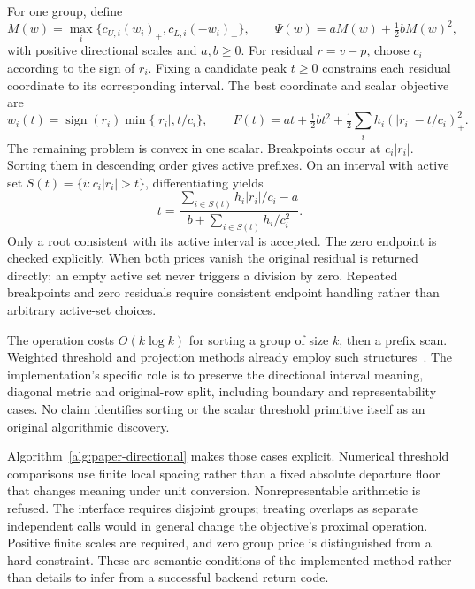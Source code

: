 For one group, define
\begin{equation}\label{eq:paper-directional-price}
 M(w)=\max_i\{c_{U,i}(w_i)_+,c_{L,i}(-w_i)_+\},\qquad
 \Psi(w)=aM(w)+\tfrac12bM(w)^2,
\end{equation}
with positive directional scales and $a,b\geq0$. For residual $r=v-p$,
choose $c_i$ according to the sign of $r_i$. Fixing a candidate peak
$t\geq0$ constrains each residual coordinate to its corresponding
interval. The best coordinate and scalar objective are
\begin{equation}\label{eq:paper-threshold-model}
 w_i(t)=\operatorname{sign}(r_i)\min\{|r_i|,t/c_i\},\qquad
 F(t)=at+\tfrac12bt^2+\tfrac12\sum_i h_i(|r_i|-t/c_i)_+^2.
\end{equation}
The remaining problem is convex in one scalar. Breakpoints occur at
$c_i|r_i|$. Sorting them in descending order gives active prefixes. On an interval with
active set $S(t)=\{i:c_i|r_i|>t\}$, differentiating yields
\begin{equation}\label{eq:paper-threshold-root}
 t=\frac{\sum_{i\in S(t)}h_i|r_i|/c_i-a}
          {b+\sum_{i\in S(t)}h_i/c_i^2}.
\end{equation}
Only a root consistent with its active interval is accepted. The zero
endpoint is checked explicitly. When both prices vanish the original
residual is returned directly; an empty active set never triggers a
division by zero. Repeated breakpoints and zero residuals require
consistent endpoint handling rather than arbitrary active-set choices.

The operation costs $O(k\log k)$ for sorting a group of size $k$, then
a prefix scan. Weighted threshold and projection methods already employ
such structures~\cite{weighted,duchi,condat}. The implementation's specific
role is to preserve the directional interval meaning, diagonal metric
and original-row split, including boundary and representability cases.
No claim identifies sorting or the scalar threshold primitive itself
as an original algorithmic discovery.

Algorithm~\ref{alg:paper-directional} makes those cases explicit. Numerical
threshold comparisons use finite local spacing rather than a fixed
absolute departure floor that changes meaning under unit conversion.
Nonrepresentable arithmetic is refused. The interface requires disjoint
groups; treating overlaps as separate independent calls would in general
change the objective's proximal operation. Positive finite scales are
required, and zero group price is distinguished from a hard constraint.
These are semantic conditions of the implemented method rather than
details to infer from a successful backend return code.

